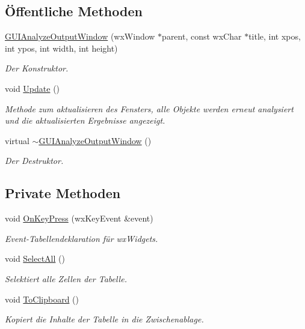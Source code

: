 \subsection*{Öffentliche Methoden}
\begin{DoxyCompactItemize}
\item 
\hyperlink{classGUIAnalyzeOutputWindow_af9407245a6b2a0478579c4d592a31e63}{G\-U\-I\-Analyze\-Output\-Window} (wx\-Window $\ast$parent, const wx\-Char $\ast$title, int xpos, int ypos, int width, int height)
\begin{DoxyCompactList}\small\item\em Der Konstruktor. \end{DoxyCompactList}\item 
void \hyperlink{classGUIAnalyzeOutputWindow_a9ea5a7cf46d6189f368315903508cecc}{Update} ()
\begin{DoxyCompactList}\small\item\em Methode zum aktualisieren des Fensters, alle Objekte werden erneut analysiert und die aktualisierten Ergebnisse angezeigt. \end{DoxyCompactList}\item 
virtual \hyperlink{classGUIAnalyzeOutputWindow_a8c5f2447557358ea724b68a89f363e37}{$\sim$\-G\-U\-I\-Analyze\-Output\-Window} ()
\begin{DoxyCompactList}\small\item\em Der Destruktor. \end{DoxyCompactList}\end{DoxyCompactItemize}
\subsection*{Private Methoden}
\begin{DoxyCompactItemize}
\item 
void \hyperlink{classGUIAnalyzeOutputWindow_ab574494affda3239c7a7a28c6dc347de}{On\-Key\-Press} (wx\-Key\-Event \&event)
\begin{DoxyCompactList}\small\item\em Event-\/\-Tabellendeklaration für wx\-Widgets. \end{DoxyCompactList}\item 
void \hyperlink{classGUIAnalyzeOutputWindow_a1543bc16c0c5722fb961bea8d6462bb6}{Select\-All} ()
\begin{DoxyCompactList}\small\item\em Selektiert alle Zellen der Tabelle. \end{DoxyCompactList}\item 
void \hyperlink{classGUIAnalyzeOutputWindow_a9a25abd50d7d0bd163143924594385f4}{To\-Clipboard} ()
\begin{DoxyCompactList}\small\item\em Kopiert die Inhalte der Tabelle in die Zwischenablage. \end{DoxyCompactList}\end{DoxyCompactItemize}
